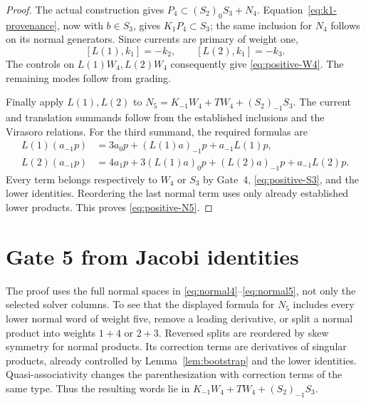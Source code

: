 \documentclass[11pt,a4paper]{article}
\theoremstyle{definition}
\begin{document}
\begin{proof}
The actual construction gives $P_4\subset(S_2)_0S_3+N_4$.
Equation~\eqref{eq:k1-provenance}, now with $b\in S_3$, gives
$K_1P_4\subset S_3$; the same inclusion for $N_4$ follows on its
normal generators. Since currents are primary of weight one,
\[
 [L(1),k_1]=-k_2,\qquad [L(2),k_1]=-k_3.
\]
The controls on $L(1)W_4,L(2)W_4$ consequently give
\eqref{eq:positive-W4}. The remaining modes follow from grading.

Finally apply $L(1),L(2)$ to
$N_5=K_{-1}W_4+TW_4+(S_2)_{-1}S_3$. The current and translation
summands follow from the established inclusions and the Virasoro
relations. For the third summand, the required formulas are
\begin{align*}
 L(1)(a_{-1}p)
 &=3a_0p+(L(1)a)_{-1}p+a_{-1}L(1)p,\\
 L(2)(a_{-1}p)
 &=4a_1p+3(L(1)a)_0p+(L(2)a)_{-1}p+a_{-1}L(2)p.
\end{align*}
Every term belongs respectively to $W_4$ or $S_3$ by Gate~4,
\eqref{eq:positive-S3}, and the lower identities. Reordering the last
normal term uses only already established lower products. This proves
\eqref{eq:positive-N5}.
\end{proof}

\section{Gate 5 from Jacobi identities}\label{sec:gate5}
The proof uses the full normal spaces in
\eqref{eq:normal4}--\eqref{eq:normal5}, not only the selected solver
columns. To see that the displayed formula for $N_5$ includes every
lower normal word of weight five, remove a leading derivative, or
split a normal product into weights $1+4$ or $2+3$. Reversed splits
are reordered by skew symmetry for normal products. Its correction
terms are derivatives of singular products, already controlled by
Lemma~\ref{lem:bootstrap} and the lower identities. Quasi-associativity
changes the parenthesization with correction terms of the same type.
Thus the resulting words lie in
$K_{-1}W_4+TW_4+(S_2)_{-1}S_3$.
\end{document}
